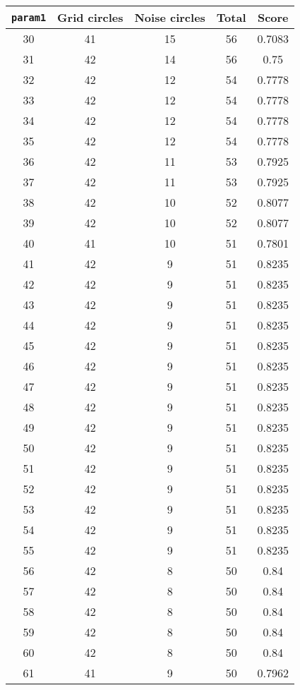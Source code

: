 \documentclass[letterpaper, 12pt]{article}
\begin{document}
\begin{longtable}{|c|c|c|c|c|}
\hline
\textbf{\texttt{param1}} & \textbf{Grid circles} & \textbf{Noise circles} & \textbf{Total} & \textbf{Score} \\
\hline
30 & 41 & 15 & 56 & 0.7083 \\
\hline
31 & 42 & 14 & 56 & 0.75 \\
\hline
32 & 42 & 12 & 54 & 0.7778 \\
\hline
33 & 42 & 12 & 54 & 0.7778 \\
\hline
34 & 42 & 12 & 54 & 0.7778 \\
\hline
35 & 42 & 12 & 54 & 0.7778 \\
\hline
36 & 42 & 11 & 53 & 0.7925 \\
\hline
37 & 42 & 11 & 53 & 0.7925 \\
\hline
38 & 42 & 10 & 52 & 0.8077 \\
\hline
39 & 42 & 10 & 52 & 0.8077 \\
\hline
40 & 41 & 10 & 51 & 0.7801 \\
\hline
41 & 42 & 9 & 51 & 0.8235 \\
\hline
42 & 42 & 9 & 51 & 0.8235 \\
\hline
43 & 42 & 9 & 51 & 0.8235 \\
\hline
44 & 42 & 9 & 51 & 0.8235 \\
\hline
45 & 42 & 9 & 51 & 0.8235 \\
\hline
46 & 42 & 9 & 51 & 0.8235 \\
\hline
47 & 42 & 9 & 51 & 0.8235 \\
\hline
48 & 42 & 9 & 51 & 0.8235 \\
\hline
49 & 42 & 9 & 51 & 0.8235 \\
\hline
50 & 42 & 9 & 51 & 0.8235 \\
\hline
51 & 42 & 9 & 51 & 0.8235 \\
\hline
52 & 42 & 9 & 51 & 0.8235 \\
\hline
53 & 42 & 9 & 51 & 0.8235 \\
\hline
54 & 42 & 9 & 51 & 0.8235 \\
\hline
55 & 42 & 9 & 51 & 0.8235 \\
\hline
56 & 42 & 8 & 50 & 0.84 \\
\hline
57 & 42 & 8 & 50 & 0.84 \\
\hline
58 & 42 & 8 & 50 & 0.84 \\
\hline
59 & 42 & 8 & 50 & 0.84 \\
\hline
60 & 42 & 8 & 50 & 0.84 \\
\hline
61 & 41 & 9 & 50 & 0.7962 \\

\end{longtable}
\end{document}
